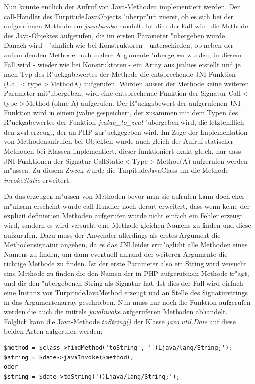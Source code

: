 Nun konnte endlich der Aufruf von Java-Methoden implementiert werden. Der call-Handler des TurpitudeJavaObjects "uberpr"uft zuerst, ob es sich bei der
aufgerufenen Methode um \emph{javaInvoke} handelt. Ist dies der Fall wird die Methode des Java-Objektes aufgerufen, die im ersten Parameter "ubergeben 
wurde. Danach wird - "ahnlich wie bei Konstruktoren - unterschieden, ob neben der aufzurufenden Methode noch andere Argumente "ubergeben wurden, in diesem
Fall wird - wieder wie bei Konstruktoren - ein Array aus jvalues erstellt und je nach Typ des R"uckgabewertes der Methode die entsprechende JNI-Funktion
(Call$<$type$>$MethodA) aufgerufen. Wurden ausser der Methode keine weiteren Parameter mit"ubergeben, wird eine entsprechende Funktion der Signatur
Call$<$type$>$Method (ohne A) aufgerufen. Der R"uckgabewert der aufgerufenen JNI-Funktion wird in einem jvalue gespeichert, der zusammen mit dem
Typen des R"uckgabewertes der Funktion \emph{jvalue\_to\_zval} "ubergeben wird, die letztendlich den zval erzeugt, der an PHP zur"uckgegeben wird.
Im Zuge der Implementation von Methodenaufrufen bei Objekten wurde auch gleich der Aufruf statischer Methoden bei Klassen implementiert, dieser funktioniert exakt 
gleich, nur dass JNI-Funktionen der Signatur CallStatic$<$Type$>$Method(A) aufgerufen werden m"ussen. Zu diesem Zweck wurde die TurpitudeJavaClass um die Methode
\emph{invokeStatic} erweitert.

Da das erzeugen m"ussen von Methoden bevor man sie aufrufen kann doch eher m"uhsam erscheint wurde call-Handler noch derart erweitert, dass wenn keine der
explizit definierten Methoden aufgerufen wurde nicht einfach ein Fehler erzeugt wird, sondern es wird versucht eine Methode gleichen Namens zu finden und diese
aufzurufen. Dazu muss der Anwender allerdings als erstes Argument die Methodensignatur angeben, da es das JNI leider erm"oglicht alle Methoden eines Namens
zu finden, um dann eventuell anhand der weiteren Argumente die richtige Methode zu finden. Ist der erste Parameter also ein String wird versucht eine
Methode zu finden die den Namen der in PHP aufgerufenen Methode tr"agt, und die den "ubergebenen String als Signatur hat. Ist dies der Fall wird einfach 
eine Instanz von TurpitudeJavaMethod erzeugt und an Stelle des Signaturstrings in das Argumentenarray geschrieben. Nun muss nur noch die Funktion aufgerufen
werden die auch die mittels \emph{javaInvoke} aufgerufenen Methoden abhandelt. Folglich kann die Java-Methode \emph{toString()} der Klasse \emph{java.util.Date}
auf diese beiden Arten aufgerufen werden:
\begin{lstlisting}[caption=Zwei Arten die gleiche Methode aufzurufen]
$method = $class->findMethod('toString', '()Ljava/lang/String;');
$string = $date->javaInvoke($method);
oder
$string = $date->toString('()Ljava/lang/String;');
\end{lstlisting}

